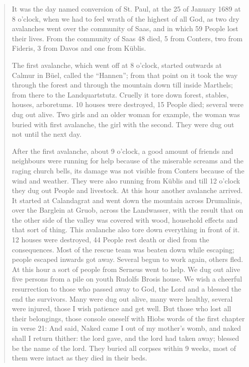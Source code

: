\documentclass[12pt, a4paper]{article}
\begin{document}
\begin{quote}
\setlength{\parskip}{1.5em}
 It was the day named  conversion of St. Paul, at the 25 of January 1689 at 8 o'clock, when we had to feel wrath of the highest of all God, as two dry avalanches went over the community of Saas, and in which 59 People lost their lives. From the community of Saas 48 died, 5 from Conters, two from Fideris, 3 from Davos and one from Küblis.
 
The first avalanche, which went off at 8 o'clock, started outwards at Calmur in Büel, called the ``Hannen''; from that point on it took the way through the forest and through the mountain down till inside Marthels; from there to the Landquartstutz. Cruelly it tore down   forest, stables, houses, arboretums. 10 houses were destroyed, 15 People died; several were dug out alive. Two girls and an older woman for example, the woman was buried with first avalanche, the girl with the second. They were dug out not until the next day. 

After the first avalanche,  about 9 o'clock,  a good amount of friends  and neighbours were running for help because of the miserable screams and the raging church bells, its damage was not visible from Conters because of the wind and weather. They were also running from Küblis and till 12 o'clock they dug out People and livestock. At this hour another avalanche arrived. It started at Calandagrat and went down the mountain across Drumalinis, over the Barglein at Gruob, across the Landwasser, with the result that on the other side of the valley was covered with wood, 	household effects and that sort of thing. This avalanche also tore down everything in front of it. 12 houses  were destroyed, 44 People rest death or died from the consequences. Most of the rescue team was beaten down while escaping; people escaped inwards got away. Several begun to work again, others fled. At this hour a sort of people from Serneus went to help. We dug out alive five persons from a pile on youth Rudolfs Brosis house. We wish a cheerful resurrection to those who passed away to God, the Lord and a blessed the end the survivors. Many were dug out alive, many were healthy, several were injured, those I wish patience and get well. But those who lost all their belongings, those console oneself with Hiobs words of the first chapter in verse 21: And said, Naked came I out of my mother's womb, and naked shall I return thither: the lord gave, and the lord had taken away; blessed be the name of the lord. They buried all corpses within 9 weeks, most of them were intact as they died in their beds. 


\end{quote}
\end{document}
